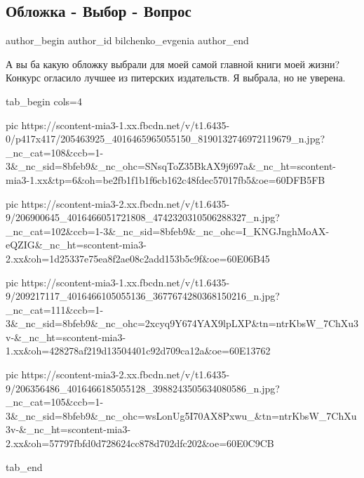  
 
 
 
 
 
\subsection{Обложка - Выбор - Вопрос}
\label{sec:29_06_2021.fb.bilchenko_evgenia.6.oblozhka}
\ifcmt
 author_begin
   author_id bilchenko_evgenia
 author_end
\fi

А вы ба какую обложку выбрали для моей самой главной книги моей жизни? Конкурс
огласило лучшее из питерских издательств. Я выбрала, но не уверена.

\ifcmt
  tab_begin cols=4

     pic https://scontent-mia3-1.xx.fbcdn.net/v/t1.6435-0/p417x417/205463925_4016465965055150_8190132746972119679_n.jpg?_nc_cat=108&ccb=1-3&_nc_sid=8bfeb9&_nc_ohc=SNsqToZ35BkAX9j697a&_nc_ht=scontent-mia3-1.xx&tp=6&oh=be2fb1f1b1f6cb162c48fdec57017fb5&oe=60DFB5FB

     pic https://scontent-mia3-2.xx.fbcdn.net/v/t1.6435-9/206900645_4016466051721808_4742320310506288327_n.jpg?_nc_cat=102&ccb=1-3&_nc_sid=8bfeb9&_nc_ohc=I_KNGJnghMoAX-eQZIG&_nc_ht=scontent-mia3-2.xx&oh=1d25337e75ea8f2ae08c2add153b5c9f&oe=60E06B45

     pic https://scontent-mia3-1.xx.fbcdn.net/v/t1.6435-9/209217117_4016466105055136_3677674280368150216_n.jpg?_nc_cat=111&ccb=1-3&_nc_sid=8bfeb9&_nc_ohc=2xcyq9Y674YAX9lpLXP&tn=ntrKbsW_7ChXu3v-&_nc_ht=scontent-mia3-1.xx&oh=428278af219d13504401c92d709ca12a&oe=60E13762

     pic https://scontent-mia3-2.xx.fbcdn.net/v/t1.6435-9/206356486_4016466185055128_3988243505634080586_n.jpg?_nc_cat=105&ccb=1-3&_nc_sid=8bfeb9&_nc_ohc=wsLonUg5I70AX8Pxwu_&tn=ntrKbsW_7ChXu3v-&_nc_ht=scontent-mia3-2.xx&oh=57797fbfd0d728624cc878d702dfc202&oe=60E0C9CB

  tab_end
\fi

